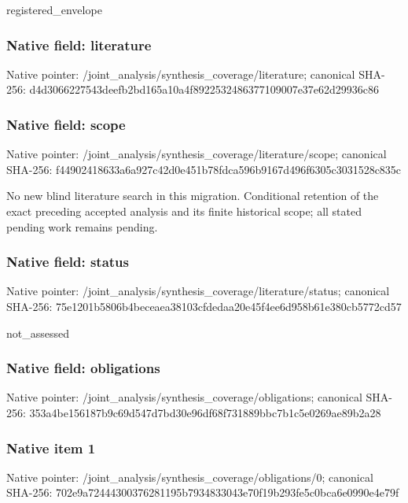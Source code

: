 \documentclass[10pt,a4paper]{article}
\begin{document}
\begingroup\raggedright\sloppy registered\_\allowbreak{}envelope\par\endgroup

\subsubsection{Native field: literature}
Native pointer: /joint\_\allowbreak{}analysis/synthesis\_\allowbreak{}coverage/literature; canonical SHA-256: d4d3066227543deefb2bd165a10a4f8922532486377109007e37e62d29936c86

\subsubsection{Native field: scope}
Native pointer: /joint\_\allowbreak{}analysis/synthesis\_\allowbreak{}coverage/literature/scope; canonical SHA-256: f44902418633a6a927c42d0e451b78fdca596b9167d496f6305c3031528c835c

\begingroup\raggedright\sloppy No new blind literature search in this migration. Conditional retention of the exact preceding accepted analysis and its finite historical scope;\allowbreak{} all stated pending work remains pending.\par\endgroup

\subsubsection{Native field: status}
Native pointer: /joint\_\allowbreak{}analysis/synthesis\_\allowbreak{}coverage/literature/status; canonical SHA-256: 75e1201b5806b4beceaea38103cfdedaa20e45f4ee6d958b61e380cb5772cd57

\begingroup\raggedright\sloppy not\_\allowbreak{}assessed\par\endgroup

\subsubsection{Native field: obligations}
Native pointer: /joint\_\allowbreak{}analysis/synthesis\_\allowbreak{}coverage/obligations; canonical SHA-256: 353a4be156187b9c69d547d7bd30e96df68f731889bbc7b1c5e0269ae89b2a28

\subsubsection{Native item 1}
Native pointer: /joint\_\allowbreak{}analysis/synthesis\_\allowbreak{}coverage/obligations/0; canonical SHA-256: 702e9a72444300376281195b7934833043e70f19b293fe5c0bca6e0990e4e79f
\end{document}
